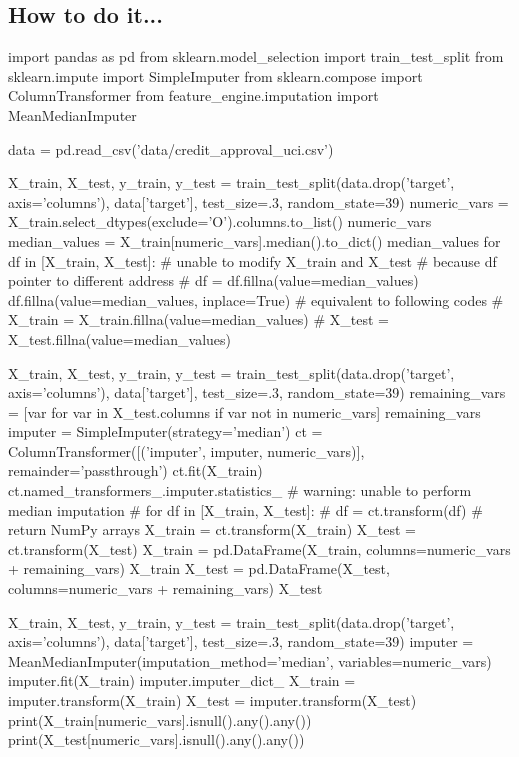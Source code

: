 \subsection{How to do it...}
\begin{pyc}
import pandas as pd
from sklearn.model_selection import train_test_split
from sklearn.impute import SimpleImputer
from sklearn.compose import ColumnTransformer
from feature_engine.imputation import MeanMedianImputer

data = pd.read_csv('data/credit_approval_uci.csv')

X_train, X_test, y_train, y_test = train_test_split(data.drop('target',
                                                              axis='columns'),
                                                    data['target'],
                                                    test_size=.3,
                                                    random_state=39)
numeric_vars = X_train.select_dtypes(exclude='O').columns.to_list()
numeric_vars
median_values = X_train[numeric_vars].median().to_dict()
median_values
for df in [X_train, X_test]:
# unable to modify X_train and X_test
# because df pointer to different address
#     df = df.fillna(value=median_values)
    df.fillna(value=median_values, inplace=True)
# equivalent to following codes
# X_train = X_train.fillna(value=median_values)
# X_test = X_test.fillna(value=median_values)

X_train, X_test, y_train, y_test = train_test_split(data.drop('target',
                                                              axis='columns'),
                                                    data['target'],
                                                    test_size=.3,
                                                    random_state=39)
remaining_vars = [var for var in X_test.columns if var not in numeric_vars]
remaining_vars
imputer = SimpleImputer(strategy='median')
ct = ColumnTransformer([('imputer', imputer, numeric_vars)],
                       remainder='passthrough')
ct.fit(X_train)
ct.named_transformers_.imputer.statistics_
# warning: unable to perform median imputation
# for df in [X_train, X_test]:
#     df = ct.transform(df)
# return NumPy arrays
X_train = ct.transform(X_train)
X_test = ct.transform(X_test)
X_train = pd.DataFrame(X_train, columns=numeric_vars + remaining_vars)
X_train
X_test = pd.DataFrame(X_test, columns=numeric_vars + remaining_vars)
X_test

X_train, X_test, y_train, y_test = train_test_split(data.drop('target',
                                                              axis='columns'),
                                                    data['target'],
                                                    test_size=.3,
                                                    random_state=39)
imputer = MeanMedianImputer(imputation_method='median', variables=numeric_vars)    
imputer.fit(X_train)
imputer.imputer_dict_
X_train = imputer.transform(X_train)
X_test = imputer.transform(X_test)
print(X_train[numeric_vars].isnull().any().any())
print(X_test[numeric_vars].isnull().any().any())
\end{pyc}
